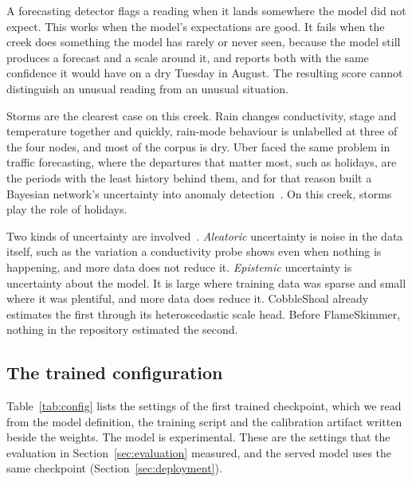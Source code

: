 \documentclass{article}
\begin{document}
A forecasting detector flags a reading when it lands somewhere the model did not
expect. This works when the model's expectations are good. It fails when the
creek does something the model has rarely or never seen, because the model
still produces a forecast and a scale around it, and reports both with the same
confidence it would have on a dry Tuesday in August. The resulting score
cannot distinguish an unusual reading from an unusual situation.

Storms are the clearest case on this creek. Rain changes conductivity, stage
and temperature together and quickly, rain-mode behaviour is unlabelled at
three of the four nodes, and most of the corpus is dry. Uber faced the same
problem in traffic forecasting, where the departures that matter most, such as
holidays, are the periods with the least history behind them, and for that
reason built a Bayesian network's uncertainty into anomaly
detection~\citep{zhu2017uber}. On this creek, storms play the role of holidays.

Two kinds of uncertainty are involved~\citep{kendall2017uncertainties}.
\emph{Aleatoric} uncertainty is noise in the data itself, such as the
variation a conductivity probe shows even when nothing is happening, and more
data does not reduce it. \emph{Epistemic} uncertainty is uncertainty about the
model. It is large where training data was sparse and small where it was
plentiful, and more data does reduce it. CobbleShoal already estimates the
first through its heteroscedastic scale head. Before FlameSkimmer, nothing in
the repository estimated the second.

\subsection{The trained configuration}
\label{sec:configuration}

Table~\ref{tab:config} lists the settings of the first trained checkpoint,
which we read from the model definition, the training script and the
calibration artifact written beside the weights. The model is experimental.
These are the settings that the evaluation in Section~\ref{sec:evaluation}
measured, and the served model uses the same checkpoint
(Section~\ref{sec:deployment}).
\end{document}

